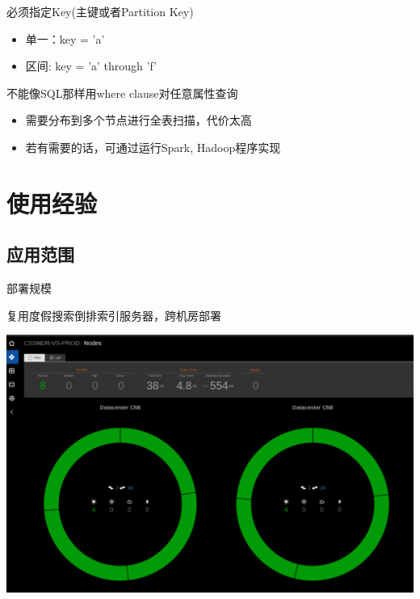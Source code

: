 \documentclass{beamer}
\begin{document}
\begin{CJK}{UTF8}{gbsn}
\begin{frame}{}
  \begin{block}{必须指定Key(主键或者Partition Key)}
    \begin{itemize}
      \item {单一：key = 'a'}
      \item {区间: key = 'a' through 'f'}
    \end{itemize}
  \end{block}
  \pause
  \begin{block}{不能像SQL那样用where clause对任意属性查询}
    \begin{itemize}
      \item {需要分布到多个节点进行全表扫描，代价太高}
      \item {若有需要的话，可通过运行Spark, Hadoop程序实现}
    \end{itemize}
  \end{block}
\end{frame}


\section{使用经验}

\subsection{应用范围}

\begin{frame}{部署规模}
  \begin{block}{复用度假搜索倒排索引服务器，跨机房部署}
    \begin{center}
      \includegraphics[scale=0.2]{./images/deployment-status}
    \end{center}
  \end{block}
\end{frame}


\end{CJK}
\end{document}
